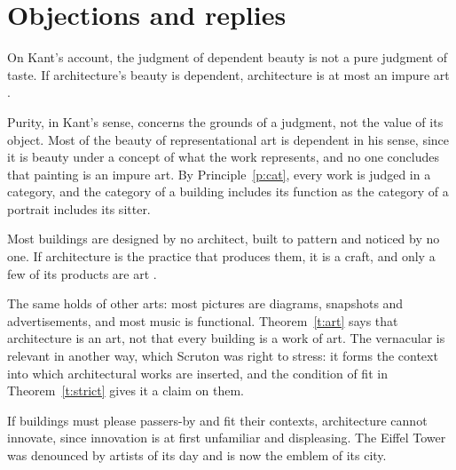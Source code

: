 \documentclass{situationist-preprint}
\begin{document}
\section{Objections and replies}

\begin{objection}\label{o:kant}
On Kant's account, the judgment of dependent beauty is not a pure judgment of taste. If architecture's beauty is dependent, architecture is at most an impure art \citep{Kant1790}.
\end{objection}

\begin{reply}
Purity, in Kant's sense, concerns the grounds of a judgment, not the value of its object. Most of the beauty of representational art is dependent in his sense, since it is beauty under a concept of what the work represents, and no one concludes that painting is an impure art. By Principle~\ref{p:cat}, every work is judged in a category, and the category of a building includes its function as the category of a portrait includes its sitter.
\end{reply}

\begin{objection}[Vernacular]\label{o:vern}
Most buildings are designed by no architect, built to pattern and noticed by no one. If architecture is the practice that produces them, it is a craft, and only a few of its products are art \citep{Scruton1979}.
\end{objection}

\begin{reply}
The same holds of other arts: most pictures are diagrams, snapshots and advertisements, and most music is functional. Theorem~\ref{t:art} says that architecture is an art, not that every building is a work of art. The vernacular is relevant in another way, which Scruton was right to stress: it forms the context into which architectural works are inserted, and the condition of fit in Theorem~\ref{t:strict} gives it a claim on them.
\end{reply}

\begin{objection}\label{o:innov}
If buildings must please passers-by and fit their contexts, architecture cannot innovate, since innovation is at first unfamiliar and displeasing. The Eiffel Tower was denounced by artists of its day and is now the emblem of its city.
\end{objection}
\end{document}

